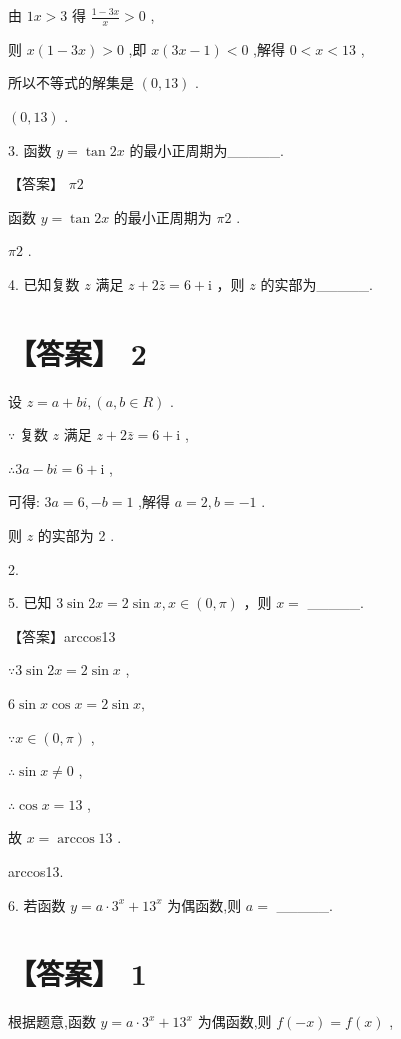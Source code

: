 \documentclass[10pt]{article}
\begin{document}
由 \({1x} > 3\) 得 \(\frac{1 - {3x}}{x} > 0\) ,

则 \(x\left( {1 - {3x}}\right)  > 0\) ,即 \(x\left( {{3x} - 1}\right)  < 0\) ,解得 \(0 < x < {13}\) ,

所以不等式的解集是 \(\left( {0,{13}}\right)\) .

\(\left( {0,{13}}\right)\) .

3. 函数 \(y = \tan {2x}\) 的最小正周期为\_\_\_\_\_.

【答案】 \({\pi 2}\)

函数 \(y = \tan {2x}\) 的最小正周期为 \({\pi 2}\) .

\({\pi 2}\) .

4. 已知复数 \(z\) 满足 \(z + 2\bar{z} = 6 + \mathrm{i}\) ，则 \(z\) 的实部为\_\_\_\_\_.

\section*{【答案】 2}

设 \(z = a + {bi},\left( {a,b \in  R}\right)\) .

\(\because\) 复数 \(z\) 满足 \(z + 2\bar{z} = 6 + \mathrm{i}\) ,

\(\therefore {3a} - {bi} = 6 + \mathrm{i}\) ,

可得: \({3a} = 6, - b = 1\) ,解得 \(a = 2,b =  - 1\) .

则 \(z\) 的实部为 2 .

2.

5. 已知 \(3\sin {2x} = 2\sin x,x \in  \left( {0,\pi }\right)\) ，则 \(x =\) \_\_\_\_\_.

【答案】arccos13

\(\because 3\sin {2x} = 2\sin x\) ,

\(6\sin x\cos x = 2\sin x,\)

\(\because x \in  \left( {0,\pi }\right)\) ,

\(\therefore \sin x \neq  0\) ,

\(\therefore \cos x = {13}\) ,

故 \(x = \arccos {13}\) .

arccos13.

6. 若函数 \(y = a \cdot  {3}^{x} + {13}^{x}\) 为偶函数,则 \(a =\) \_\_\_\_\_.

\section*{【答案】 1}

根据题意,函数 \(y = a \cdot  {3}^{x} + {13}^{x}\) 为偶函数,则 \(f\left( {-x}\right)  = f\left( x\right)\) ,
\end{document}
